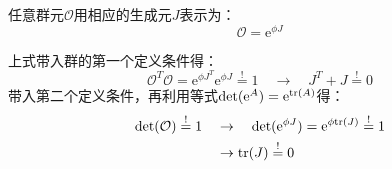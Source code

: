 任意群元$\mathcal{O}$用相应的生成元$J$表示为：
\begin{equation}
\label{equ3.59}
\mathcal{O} = \mathrm{e}^{\phi J} %
\end{equation}

上式带入群的第一个定义条件得：
\begin{equation}
\label{equ3.60}
\mathcal{O}^T \mathcal{O} = \mathrm{e}^{\phi J^T} \mathrm{e}^{\phi J} \stackrel{!}{=} 1 \quad \rightarrow \quad J^T + J \stackrel{!}{=} 0
\end{equation}
带入第二个定义条件，再利用等式$\det(\mathrm{e}^A) = \mathrm{e}^{\text{tr}(A)}$得：
\begin{align}
\det(\mathcal{O}) \stackrel{!}{=} 1 \quad &\rightarrow \quad \det(\mathrm{e}^{\phi J}) = \mathrm{e}^{\phi \text{tr} (J)} \stackrel{!}{=} 1
\nonumber \\
\label{equ3.61}
& \rightarrow \text{tr}(J) \stackrel{!}{=} 0
\end{align}

